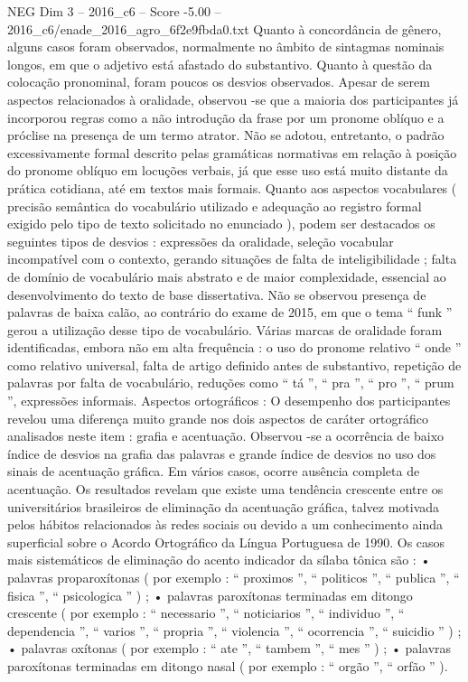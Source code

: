 \begin{textsample}{NEG Dim 3 – 2016\_c6 – Score -5.00 – 2016\_c6/enade\_2016\_agro\_6f2e9fbda0.txt}
Quanto à concordância de gênero, alguns casos foram observados, normalmente no âmbito de sintagmas nominais longos, em que o adjetivo está afastado do substantivo.
Quanto à questão da colocação pronominal, foram poucos os desvios observados.
Apesar de serem aspectos relacionados à oralidade, observou -se que a maioria dos participantes já incorporou regras como a não introdução da frase por um pronome oblíquo e a próclise na presença de um termo atrator.
Não se adotou, entretanto, o padrão excessivamente formal descrito pelas gramáticas normativas em relação à posição do pronome oblíquo em locuções verbais, já que esse uso está muito distante da prática cotidiana, até em textos mais formais.
Quanto aos aspectos vocabulares ( precisão semântica do vocabulário utilizado e adequação ao registro formal exigido pelo tipo de texto solicitado no enunciado ), podem ser destacados os seguintes tipos de desvios : expressões da oralidade, seleção vocabular incompatível com o contexto, gerando situações de falta de inteligibilidade ; falta de domínio de vocabulário mais abstrato e de maior complexidade, essencial ao desenvolvimento do texto de base dissertativa.
Não se observou presença de palavras de baixa calão, ao contrário do exame de 2015, em que o tema “ funk ” gerou a utilização desse tipo de vocabulário.
Várias marcas de oralidade foram identificadas, embora não em alta frequência : o uso do pronome relativo “ onde ” como relativo universal, falta de artigo definido antes de substantivo, repetição de palavras por falta de vocabulário, reduções como “ tá ”, “ pra ”, “ pro ”, “ prum ”, expressões informais.
Aspectos ortográficos : O desempenho dos participantes revelou uma diferença muito grande nos dois aspectos de caráter ortográfico analisados neste item : grafia e acentuação.
Observou -se a ocorrência de baixo índice de desvios na grafia das palavras e grande índice de desvios no uso dos sinais de acentuação gráfica.
Em vários casos, ocorre ausência completa de acentuação.
Os resultados revelam que existe uma tendência crescente entre os universitários brasileiros de eliminação da acentuação gráfica, talvez motivada pelos hábitos relacionados às redes sociais ou devido a um conhecimento ainda superficial sobre o Acordo Ortográfico da Língua Portuguesa de 1990.
Os casos mais sistemáticos de eliminação do acento indicador da sílaba tônica são : • palavras proparoxítonas ( por exemplo : “ proximos ”, “ politicos ”, “ publica ”, “ fisica ”, “ psicologica ” ) ; • palavras paroxítonas terminadas em ditongo crescente ( por exemplo : “ necessario ”, “ noticiarios ”, “ individuo ”, “ dependencia ”, “ varios ”, “ propria ”, “ violencia ”, “ ocorrencia ”, “ suicidio ” ) ; • palavras oxítonas ( por exemplo : “ ate ”, “ tambem ”, “ mes ” ) ; • palavras paroxítonas terminadas em ditongo nasal ( por exemplo : “ orgão ”, “ orfão ” ).

\end{textsample}
